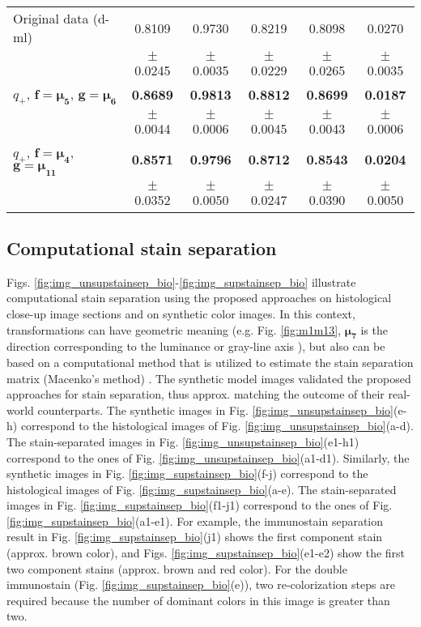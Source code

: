 \documentclass[superscriptaddress,longbibliography,aps,prl,twocolumn,10pt]{revtex4-2}
\begin{document}
\begin{table}[t]
{\begin{tabular}{lccccc}
\midrule
Original data (d-ml) \cite{Kather2016} & 0.8109 & 0.9730 & 0.8219 & 0.8098 & 0.0270 \\
 & $\pm$0.0245 & $\pm$0.0035 & $\pm$0.0229 & $\pm$0.0265 & $\pm$0.0035 \\
$q_+$, $\boldsymbol{f} = \boldsymbol{\mu_{5}}$, $\boldsymbol{g} = \boldsymbol{\mu_{6}}$ & \textbf{0.8689} & \textbf{0.9813} & \textbf{0.8812} & \textbf{0.8699} & \textbf{0.0187} \\
 & $\pm$0.0044 & $\pm$0.0006 & $\pm$0.0045 & $\pm$0.0043 & $\pm$0.0006 \\
$q_+$, $\boldsymbol{f} = \boldsymbol{\mu_{4}}$, $\boldsymbol{g} = \boldsymbol{\mu_{11}}$ & \textbf{0.8571} & \textbf{0.9796} & \textbf{0.8712} & \textbf{0.8543} & \textbf{0.0204} \\
 & $\pm$0.0352 & $\pm$0.0050 & $\pm$0.0247 & $\pm$0.0390 & $\pm$0.0050 \\
\bottomrule
\end{tabular}}
\label{tab:ml_comp2}
\end{table}

\subsection*{\normalsize{Computational stain separation}}
Figs. \ref{fig:img_unsupstainsep_bio}-\ref{fig:img_supstainsep_bio} illustrate computational stain separation using the proposed approaches on histological close-up image sections and on synthetic color images. In this context, transformations can have geometric meaning (e.g. Fig. \ref{fig:m1m13}, $\boldsymbol{\mu_7}$ is the direction corresponding to the luminance or gray-line axis \cite{Moxey2003, Ell2007a}), but also can be based on a computational method that is utilized to estimate the stain separation matrix (Macenko's method) \cite{Macenko2009, stain_normalisation_toolbox_v2_2}. The synthetic model images validated the proposed approaches for stain separation, thus approx. matching the outcome of their real-world counterparts. The synthetic images in Fig. \ref{fig:img_unsupstainsep_bio}(e-h) correspond to the histological images of Fig. \ref{fig:img_unsupstainsep_bio}(a-d). The stain-separated images in Fig. \ref{fig:img_unsupstainsep_bio}(e1-h1) correspond to the ones of Fig. \ref{fig:img_unsupstainsep_bio}(a1-d1). Similarly, the synthetic images in Fig. \ref{fig:img_supstainsep_bio}(f-j) correspond to the histological images of Fig. \ref{fig:img_supstainsep_bio}(a-e). The stain-separated images in Fig. \ref{fig:img_supstainsep_bio}(f1-j1) correspond to the ones of Fig. \ref{fig:img_supstainsep_bio}(a1-e1). For example, the immunostain separation result in Fig. \ref{fig:img_supstainsep_bio}(j1) shows the first component stain (approx. brown color), and Figs. \ref{fig:img_supstainsep_bio}(e1-e2) show the first two component stains (approx. brown and red color). For the double immunostain (Fig. \ref{fig:img_supstainsep_bio}(e)), two re-colorization steps are required because the number of dominant colors in this image is greater than two. 
\end{document}
